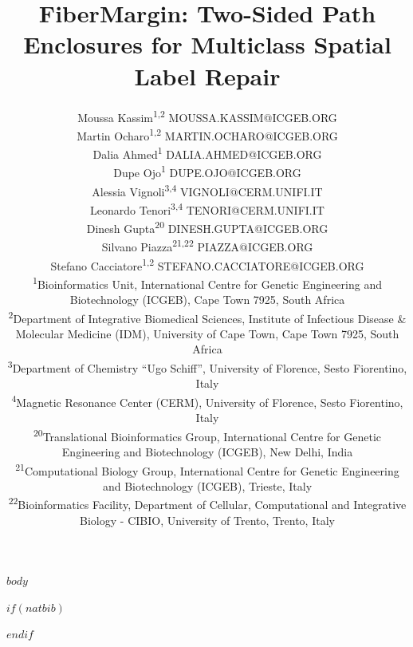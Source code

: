 \documentclass[twoside,11pt]{article}
\begin{document}
\raggedbottom

\title{FiberMargin: Two-Sided Path Enclosures for Multiclass Spatial Label Repair}

\author{%
\name Moussa Kassim\textsuperscript{1,2} \email MOUSSA.KASSIM@ICGEB.ORG \\
\name Martin Ocharo\textsuperscript{1,2} \email MARTIN.OCHARO@ICGEB.ORG \\
\name Dalia Ahmed\textsuperscript{1} \email DALIA.AHMED@ICGEB.ORG \\
\name Dupe Ojo\textsuperscript{1} \email DUPE.OJO@ICGEB.ORG \\
\name Alessia Vignoli\textsuperscript{3,4} \email VIGNOLI@CERM.UNIFI.IT \\
\name Leonardo Tenori\textsuperscript{3,4} \email TENORI@CERM.UNIFI.IT \\
\name Dinesh Gupta\textsuperscript{20} \email DINESH.GUPTA@ICGEB.ORG \\
\name Silvano Piazza\textsuperscript{21,22} \email PIAZZA@ICGEB.ORG \\
\name Stefano Cacciatore\textsuperscript{1,2} \email STEFANO.CACCIATORE@ICGEB.ORG \\
\addr \textsuperscript{1}Bioinformatics Unit, International Centre for Genetic
Engineering and Biotechnology (ICGEB), Cape Town 7925, South Africa \\
\addr \textsuperscript{2}Department of Integrative Biomedical Sciences,
Institute of Infectious Disease \& Molecular Medicine (IDM), University of Cape
Town, Cape Town 7925, South Africa \\
\addr \textsuperscript{3}Department of Chemistry ``Ugo Schiff'', University of
Florence, Sesto Fiorentino, Italy \\
\addr \textsuperscript{4}Magnetic Resonance Center (CERM), University of Florence,
Sesto Fiorentino, Italy \\
\addr \textsuperscript{20}Translational Bioinformatics Group, International Centre
for Genetic Engineering and Biotechnology (ICGEB), New Delhi, India \\
\addr \textsuperscript{21}Computational Biology Group, International Centre for
Genetic Engineering and Biotechnology (ICGEB), Trieste, Italy \\
\addr \textsuperscript{22}Bioinformatics Facility, Department of Cellular,
Computational and Integrative Biology - CIBIO, University of Trento, Trento, Italy}

\maketitle

$body$

$if(natbib)$

$endif$
\end{document}
